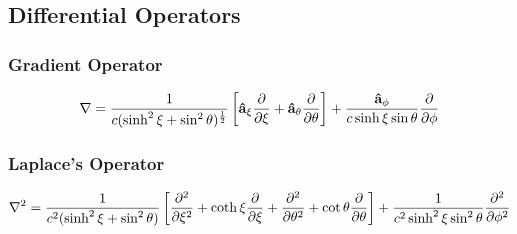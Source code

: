 \documentclass[fontsize=11pt, %
                             paper=a4, %
                             twoside, %
                             captions=tableheading,
                             index=totoc,
                             hyperref]{labbook}
\begin{document}
\subsection{Differential Operators}
\subsubsection{Gradient Operator}
\begin{equation}
\nabla=\frac{1}{c(\sinh^2\xi+\sin^2\theta)^{\frac{1}{2}}}\left[\mathbf{\hat{a}}_{\xi} \frac{\partial }{\partial \xi}+\mathbf{\hat{a}}_{\theta}\frac{\partial }{\partial \theta}\right]+\frac{\mathbf{\hat{a}}_{\phi}}{c\sinh\xi\sin\theta}\frac{\partial }{\partial \phi}
\end{equation}
\subsubsection{Laplace's Operator}
\begin{equation}
\nabla^2=\frac{1}{c^2(\sinh^2\xi+\sin^2\theta)}\left[\frac{\partial^2 }{\partial \xi^2}+\coth\xi\frac{\partial }{\partial \xi}+\frac{\partial^2 }{\partial \theta^2}+\cot\theta\frac{\partial }{\partial \theta}\right]+\frac{1}{c^2\sinh^2\xi\sin^2\theta}\frac{\partial^2 }{\partial \phi^2}
\end{equation}
\end{document}
